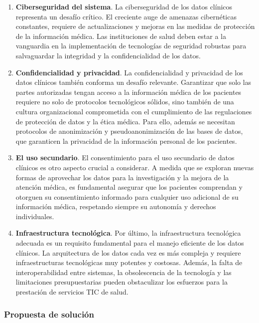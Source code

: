\begin{enumerate}[label=\roman*.]
    \item \textbf{Ciberseguridad del sistema}. La ciberseguridad de los datos clínicos representa un desafío crítico. El creciente auge de amenazas cibernéticas constantes, requiere de actualizaciones y mejoras en las medidas de protección de la información médica. Las instituciones de salud deben estar a la vanguardia en la implementación de tecnologías de seguridad robustas para salvaguardar la integridad y la confidencialidad de los datos.
    \item \textbf{Confidencialidad y privacidad}.   La confidencialidad y privacidad de los datos clínicos también conforma un desafío relevante. Garantizar que solo las partes autorizadas tengan acceso a la información médica de los pacientes requiere no solo de protocolos tecnológicos sólidos, sino también de una cultura organizacional comprometida con el cumplimiento de las regulaciones de protección de datos y la ética médica. Para ello, además se necesitan protocolos de anonimización y pseudoanonimización de las bases de datos, que garanticen la privacidad de la información personal de los pacientes.
    \item \textbf{El uso secundario}. El consentimiento para el uso secundario de datos clínicos es otro aspecto crucial a considerar. A medida que se exploran nuevas formas de aprovechar los datos para la investigación y la mejora de la atención médica, es fundamental asegurar que los pacientes comprendan y otorguen su consentimiento informado para cualquier uso adicional de su información médica, respetando siempre su autonomía y derechos individuales.
    \item \textbf{Infraestructura tecnológica}. Por último, la infraestructura tecnológica adecuada es un requisito fundamental para el manejo eficiente de los datos clínicos. La arquitectura de los datos cada vez es más compleja y requiere infraestructuras tecnológicas muy potentes y costosas. Además, la falta de interoperabilidad entre sistemas, la obsolescencia de la tecnología y las limitaciones presupuestarias pueden obstaculizar los esfuerzos para la prestación de servicios TIC de salud.
    
\end{enumerate}

\subsubsection{Propuesta de solución}

